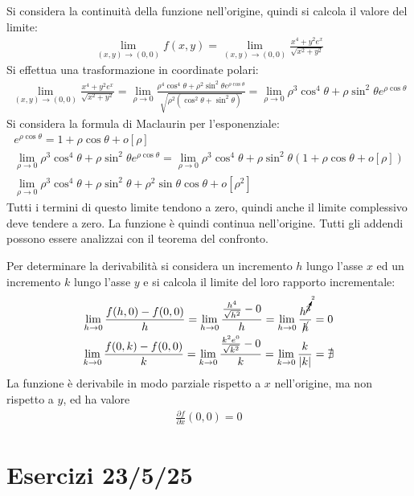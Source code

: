 \documentclass{article}
\numberwithin{equation}{subsection}
\begin{document}
Si considera la continuità della funzione nell'origine, quindi si calcola il valore del limite:
\begin{gather*}
    \lim_{(x,y)\to(0,0)}f(x,y)=\lim_{(x,y)\to(0,0)}\displaystyle\frac{x^4+y^2e^x}{\sqrt{x^2+y^2}}
\end{gather*}
Si effettua una trasformazione in coordinate polari:
\begin{gather*}
    \lim_{(x,y)\to(0,0)}\displaystyle\frac{x^4+y^2e^x}{\sqrt{x^2+y^2}}=
    \lim_{\rho\to0}\frac{\rho^4\cos^4\theta+\rho^2\sin^2\theta e^{\rho\cos\theta}}{\sqrt{\rho^2(\cos^2\theta+\sin^2\theta)}}=
    \lim_{\rho\to0}{\rho^3\cos^4\theta+\rho\sin^2\theta e^{\rho\cos\theta}}    
\end{gather*}
Si considera la formula di Maclaurin per l'esponenziale:
\begin{gather*}
    e^{\rho\cos\theta}=1+\rho\cos\theta+o[\rho]\\
    \lim_{\rho\to0}{\rho^3\cos^4\theta+\rho\sin^2\theta e^{\rho\cos\theta}}=
    \lim_{\rho\to0}{\rho^3\cos^4\theta+\rho\sin^2\theta (1+\rho\cos\theta+o[\rho])}\\
    \lim_{\rho\to0}\rho^3\cos^4\theta+\rho\sin^2\theta+\rho^2\sin\theta\cos\theta+o[\rho^2]    
\end{gather*}
Tutti i termini di questo limite tendono a zero, quindi anche il limite complessivo deve tendere a zero. La funzione è quindi continua nell'origine. Tutti gli addendi possono essere analizzai con il teorema del confronto. 

Per determinare la derivabilità si considera un incremento $h$ lungo l'asse $x$ ed un incremento $k$ lungo l'asse $y$ e si calcola il limite del loro rapporto incrementale:
\begin{gather*}
    \lim_{h\to0}\frac{f(h,0)-f(0,0)}{h}=
    \lim_{h\to0}\frac{\frac{h^4}{\sqrt{h^2}}-0}{h}=
    \lim_{h\to0}\frac{h^{\cancelto{2}{3}}}{\cancel{h}}=0\\
    \lim_{k\to0}\frac{f(0,k)-f(0,0)}{k}=
    \lim_{k\to0}\frac{\frac{k^2e^0}{\sqrt{k^2}}-0}{k}=
    \lim_{k\to0}\frac{k}{|k|}=\nexists
\end{gather*}
La funzione è derivabile in modo parziale rispetto a $x$ nell'origine, ma non rispetto a $y$, ed ha valore
\begin{gather*}
    \displaystyle\frac{\partial f}{\partial x}(0,0)=0
\end{gather*}

\clearpage

\section{Esercizi 23/5/25}
\end{document}
